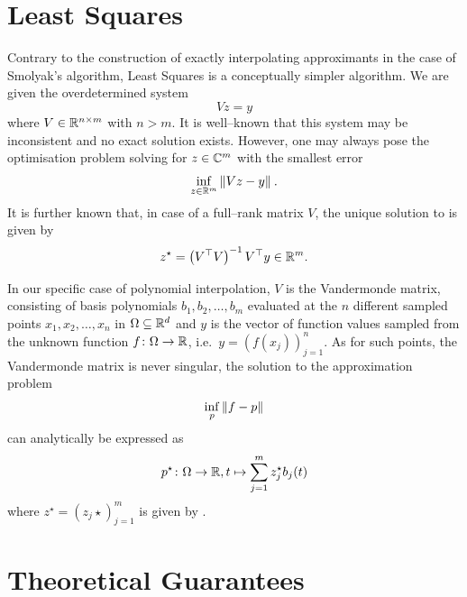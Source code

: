 \documentclass[12pt, oneside]{amsart}
\theoremstyle{definition}
\theoremstyle{remark}
\numberwithin{equation}{section}
\begin{document}
\section{Least Squares}


Contrary to the construction of exactly interpolating approximants in the case 
of Smolyak's algorithm, Least Squares is a conceptually simpler algorithm. We 
are given the overdetermined system \[
    Vz = y
\]
where \(V \in \R^{n \times m}\) with \(n > m\). It is well--known that this system may be inconsistent and no exact solution exists. However, one may always pose the optimisation problem solving for \(z \in \C^{m}\) with the smallest error
\begin{equation}\label{eq:leastSquares}
    \inf_{z \in \R^{m}} \norm[]{Vz - y}.
\end{equation}
It is further known that, in case of a full--rank matrix \(V\), the unique 
solution to  is given by 
\begin{equation}\label{eq:ls_solution_moore_penrose_inverse}
	z^\star = \left(V^\top V\right)^{-1} V^\top y \in \R^m.
\end{equation}
    
In our specific case of polynomial interpolation, \(V\) is the Vandermonde 
matrix, consisting of basis polynomials \(b_1, b_2, \dots, b_m\) evaluated at 
the $n$ different sampled points \(x_1, x_2, \dots, x_n\) in \(\Omega \subseteq 
\R^d\) and \(y\) is the vector of function values sampled from the unknown 
function \(f\from \Omega \to \R\), i.e.\ \(y = \left(f(x_j)\right)_{j=1}^n\). 
As for such points, the Vandermonde matrix is never singular, the solution to 
the approximation problem \[
    \inf_{p} \norm[]{f-p}
\]
can analytically be expressed as \[
    p^\star\from \Omega \to \R, t \mapsto \sum_{j=1}^m z_j^\star b_j(t)
\]
where \(z^\star = \left(z_j\star\right)_{j=1}^m\) is given by 
.

\section{Theoretical Guarantees}
\end{document}
